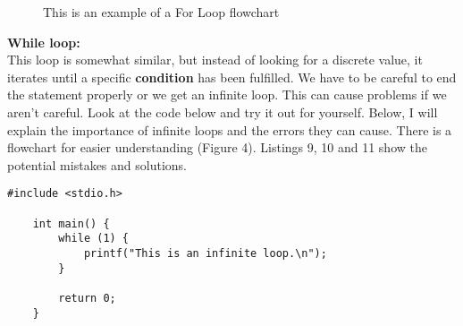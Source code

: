 \documentclass[a4paper,12pt]{article}
\begin{document}

\begin{figure}[H]
\centering
{}
\caption{This is an example of a For Loop flowchart}
    \label{fig:forloop}
\end{figure}

\vspace{1cm}

\textbf{While loop:}\\
This loop is somewhat similar, but instead of looking for a discrete value, it iterates until a specific \textbf{condition} has been fulfilled. We have to be careful to end the statement properly or we get an infinite loop. This can cause problems if we aren't careful. Look at the code below and try it out for yourself. Below, I will explain the importance of infinite loops and the errors they can cause. There is a flowchart for easier understanding (Figure 4). Listings 9, 10 and 11 show the potential mistakes and solutions.

\lstset{language=C}
\begin{lstlisting}[caption=While loop: infinite loop error]
#include <stdio.h>

    int main() {
        while (1) {
            printf("This is an infinite loop.\n");
        }

        return 0;
    }\end{lstlisting}
\end{document}
